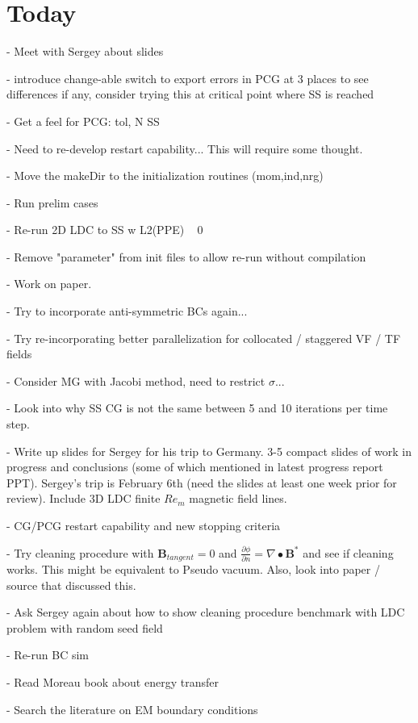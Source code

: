 \documentclass[11pt]{article}
\begin{document}
\section{Today}

- Meet with Sergey about slides

- introduce change-able switch to export errors in PCG at 3 places to see differences if any, consider trying this at critical point where SS is reached

- Get a feel for PCG: tol, N SS

- Need to re-develop restart capability... This will require some thought.

- Move the makeDir to the initialization routines (mom,ind,nrg)

- Run prelim cases

- Re-run 2D LDC to SS w L2(PPE) ~ 0

- Remove "parameter" from init files to allow re-run without compilation

- Work on paper.

- Try to incorporate anti-symmetric BCs again...

- Try re-incorporating better parallelization for collocated / staggered VF / TF fields

- Consider MG with Jacobi method, need to restrict $\sigma$...

- Look into why SS CG is not the same between 5 and 10 iterations per time step.

- Write up slides for Sergey for his trip to Germany. 3-5 compact slides of work in progress and conclusions (some of which mentioned in latest progress report PPT). Sergey's trip is February 6th (need the slides at least one week prior for review). Include 3D LDC finite $Re_m$ magnetic field lines.

- CG/PCG restart capability and new stopping criteria

- Try cleaning procedure with $\mathbf{B}_{tangent}=0$ and $\frac{\partial \phi}{\partial n} = \nabla \bullet \mathbf{B}^*$ and see if cleaning works. This might be equivalent to Pseudo vacuum. Also, look into paper / source that discussed this.

- Ask Sergey again about how to show cleaning procedure benchmark with LDC problem with random seed field

- Re-run BC sim

- Read Moreau book about energy transfer

- Search the literature on EM boundary conditions
\end{document}
